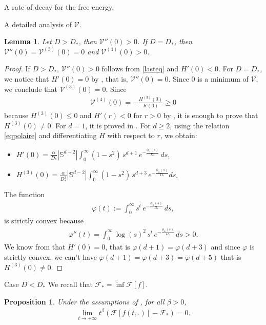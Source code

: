 \documentclass[reqno]{amsart} %
\newtheorem{proposition}{Proposition}[section]
\newtheorem{lemma}{Lemma}[section]
\begin{document}
\begin{section}{A rate of decay for the free energy.}
\begin{subsection}{A detailed analysis of  \texorpdfstring{$\mathcal{V}$}{V}.}
\begin{lemma}
\label{lemmeappendice3}
    Let $D>D_*$, then $\mathcal{V}''(0)> 0$. If $D=D_*$, then  $\mathcal{V}''(0)=\mathcal{V}^{(3)}(0)=0$ and $\mathcal{V}^{(4)}(0) > 0$.
\end{lemma}
\begin{proof}
If $D>D_*$, $\mathcal{V}''(0)>0$ follows from \eqref{lasteq} and  $H'(0)<0$. For $D=D_*$, we notice that $H'(0)=0$ by \cite[Proposition~2.1]{Li2021}, that is, $\mathcal{V}''(0)=0$.
 Since $0$ is a minimum of $\mathcal{V}$, we conclude that $\mathcal{V}^{(3)}(0)=0$. Since  
 \begin{align*}
     \mathcal{V}^{(4)}(0)= -\frac{H^{(3)}(0)}{K(0)}\geq 0
 \end{align*}
   because  $H^{(3)}(0) \leq 0$ and $H'(r)<0$ for $r>0$ by  \cite[Proposition~2.3]{Li2021}, it is enough to prove that $H^{(3)}(0) \neq 0$. 
For $d=1$, it is proved in  \cite[Lemma~2.1]{Li2021}. For $d\geq 2$,
using the relation \eqref{eqpolaire} and differentiating $H$ with respect to $r$, we obtain:
\begin{itemize}
    \item $H'(0)= \frac{\alpha}{D_*} |\mathbb{S}^{d-2}|\int_{0}^{\infty}(1-s^2)\,s^{d+1} \,e^{- \frac{\phi_{\alpha}(s)}{D_*}} \, ds$,
    \item $H^{(3)}(0)=\frac{\alpha}{D_*^3} |\mathbb{S}^{d-2}|\int_{0}^{\infty}(1-s^2)\,s^{d+3}\, e^{- \frac{\phi_{\alpha}(s)}{D_*}}  ds$.
\end{itemize}
The function 
\begin{align*}
    \varphi(t):=\int_{0}^{\infty} s^t\, e^{- \frac{\phi_{\alpha}(s)}{D_*}}  \,ds ,
\end{align*}
 is strictly convex because 
 \begin{align*}
     \varphi''(t)= \int_{0}^{\infty} \log(s)^2\,s^t \,e^{- \frac{\phi_{\alpha}(s)}{D_*}}  \,ds>0.
 \end{align*}
  We know from \cite[Proposition 2.1]{Li2021}  that $H'(0)=0$, that is $\varphi(d+1)= \varphi(d+3)$ and since $\varphi$ is strictly convex, we can't have $\varphi(d+1)=\varphi(d+3)=\varphi(d+5)$ that is $H^{(3)}(0) \neq 0$.
\end{proof}

\end{subsection}
\begin{subsection}{Case \texorpdfstring{$D<D_*$}{DD*}}
We recall that $\mathcal{F}_*=\inf{\mathcal{F}[f]}$.
\label{subsec:3.1}
\begin{proposition}
\label{prop1}
Under the assumptions of , for all  $\beta>0$, 
    \begin{align*}
        \lim_{t\rightarrow+\infty}t^{\beta}\left(\mathcal{F}[f(t,.)]-\mathcal{F}_*\right) =0.
        \end{align*}


\end{proposition}
\end{subsection}
\end{section}
\end{document}
